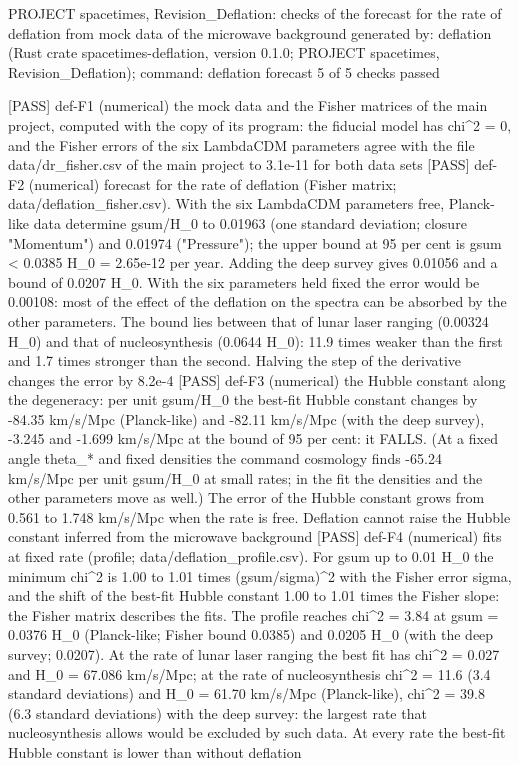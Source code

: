 \documentclass[
  10pt,
]{article}
\newenvironment{Shaded}{}{}
\newcommand{\NormalTok}[1]{#1}
\begin{document}
\begin{Shaded}
\begin{Highlighting}[]
\NormalTok{PROJECT spacetimes, Revision\_Deflation: checks of the forecast for the rate of deflation from mock data of the microwave background}
\NormalTok{generated by: deflation (Rust crate spacetimes{-}deflation, version 0.1.0; PROJECT spacetimes, Revision\_Deflation); command: deflation forecast}
\NormalTok{5 of 5 checks passed}

\NormalTok{[PASS] def{-}F1  (numerical) the mock data and the Fisher matrices of the main project, computed with the copy of its program: the fiducial model has chi\^{}2 = 0, and the Fisher errors of the six LambdaCDM parameters agree with the file data/dr\_fisher.csv of the main project to 3.1e{-}11 for both data sets}
\NormalTok{[PASS] def{-}F2  (numerical) forecast for the rate of deflation (Fisher matrix; data/deflation\_fisher.csv). With the six LambdaCDM parameters free, Planck{-}like data determine gsum/H\_0 to 0.01963 (one standard deviation; closure "Momentum") and 0.01974 ("Pressure"); the upper bound at 95 per cent is gsum \textless{} 0.0385 H\_0 = 2.65e{-}12 per year. Adding the deep survey gives 0.01056 and a bound of 0.0207 H\_0. With the six parameters held fixed the error would be 0.00108: most of the effect of the deflation on the spectra can be absorbed by the other parameters. The bound lies between that of lunar laser ranging (0.00324 H\_0) and that of nucleosynthesis (0.0644 H\_0): 11.9 times weaker than the first and 1.7 times stronger than the second. Halving the step of the derivative changes the error by 8.2e{-}4}
\NormalTok{[PASS] def{-}F3  (numerical) the Hubble constant along the degeneracy: per unit gsum/H\_0 the best{-}fit Hubble constant changes by {-}84.35 km/s/Mpc (Planck{-}like) and {-}82.11 km/s/Mpc (with the deep survey), {-}3.245 and {-}1.699 km/s/Mpc at the bound of 95 per cent: it FALLS. (At a fixed angle theta\_* and fixed densities the command \textasciigrave{}cosmology\textasciigrave{} finds {-}65.24 km/s/Mpc per unit gsum/H\_0 at small rates; in the fit the densities and the other parameters move as well.) The error of the Hubble constant grows from 0.561 to 1.748 km/s/Mpc when the rate is free. Deflation cannot raise the Hubble constant inferred from the microwave background}
\NormalTok{[PASS] def{-}F4  (numerical) fits at fixed rate (profile; data/deflation\_profile.csv). For gsum up to 0.01 H\_0 the minimum chi\^{}2 is 1.00 to 1.01 times (gsum/sigma)\^{}2 with the Fisher error sigma, and the shift of the best{-}fit Hubble constant 1.00 to 1.01 times the Fisher slope: the Fisher matrix describes the fits. The profile reaches chi\^{}2 = 3.84 at gsum = 0.0376 H\_0 (Planck{-}like; Fisher bound 0.0385) and 0.0205 H\_0 (with the deep survey; 0.0207). At the rate of lunar laser ranging the best fit has chi\^{}2 = 0.027 and H\_0 = 67.086 km/s/Mpc; at the rate of nucleosynthesis chi\^{}2 = 11.6 (3.4 standard deviations) and H\_0 = 61.70 km/s/Mpc (Planck{-}like), chi\^{}2 = 39.8 (6.3 standard deviations) with the deep survey: the largest rate that nucleosynthesis allows would be excluded by such data. At every rate the best{-}fit Hubble constant is lower than without deflation}

\end{Highlighting}
\end{Shaded}
\end{document}
